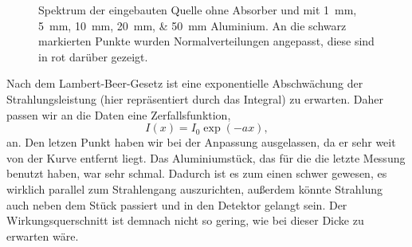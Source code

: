 \documentclass[11pt, ngerman, fleqn, DIV=15, headinclude, BCOR=2cm]{scrreprt}
\begin{document}
\begin{figure}[htbp]
    \centering
    \caption{%
        Spektrum der eingebauten Quelle ohne Absorber und mit
        \SIlist{1;5;10;20;50}{\milli\meter} Aluminium. An die schwarz
        markierten Punkte wurden Normalverteilungen angepasst, diese sind in
        rot darüber gezeigt.
    }
    \label{fig:amplituden}
\end{figure}

Nach dem Lambert-Beer-Gesetz ist eine exponentielle Abschwächung der
Strahlungsleistung (hier repräsentiert durch das Integral) zu erwarten. Daher
passen wir an die Daten eine Zerfallsfunktion,
\[
    I(x) = I_0 \exp(- a x),
\]
an. Den letzen Punkt haben wir bei der Anpassung ausgelassen, da er sehr weit
von der Kurve entfernt liegt. Das Aluminiumstück, das für die die letzte
Messung benutzt haben, war sehr schmal. Dadurch ist es zum einen schwer
gewesen, es wirklich parallel zum Strahlengang auszurichten, außerdem könnte
Strahlung auch neben dem Stück passiert und in den Detektor gelangt sein. Der
Wirkungsquerschnitt ist demnach nicht so gering, wie bei dieser Dicke zu
erwarten wäre.
\end{document}
